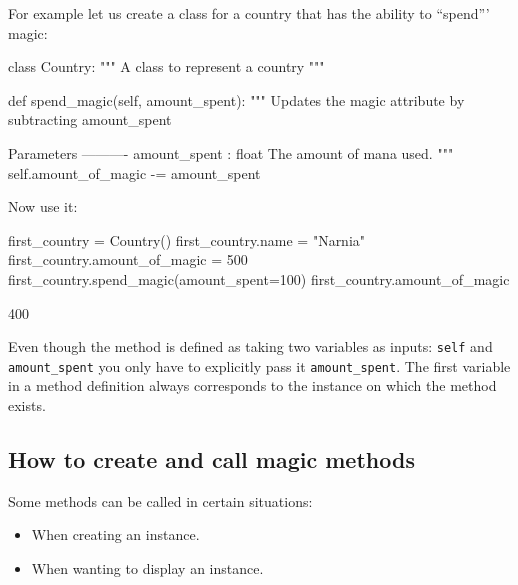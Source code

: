 For example let us create a class for a country that has the ability to
``spend'''
magic:




\begin{pyin}
class Country:
    """
    A class to represent a country
    """

    def spend_magic(self, amount_spent):
        """
        Updates the magic attribute by subtracting amount_spent

        Parameters
        ----------
        amount_spent : float
            The amount of mana used.
        """
        self.amount_of_magic -= amount_spent
\end{pyin}

Now use it:

\begin{pyin}
first_country = Country()
first_country.name = "Narnia"
first_country.amount_of_magic = 500
first_country.spend_magic(amount_spent=100)
first_country.amount_of_magic
\end{pyin}





\begin{raw}
400
\end{raw}


\begin{note}
Even though the method is defined as taking two variables as inputs: \texttt{self} and
\texttt{amount\_spent} you only have to explicitly pass it \texttt{amount\_spent}. The first
variable in a method definition always corresponds to the instance on which the
method exists.
\end{note}



\subsection{How to create and call magic methods}
\label{sec:how_to_create_and_call_magic_methods}

Some methods can be called in certain situations:
\begin{itemize}
\item 

When creating an instance.

\item 

When wanting to display an instance.

\end{itemize}


